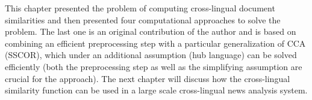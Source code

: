 \vspace{5mm}
This chapter presented the problem of computing cross-lingual document similarities and then presented four computational
approaches to solve the problem. The last one is an original contribution of the author and is based on combining an efficient
preprocessing step with a particular generalization of CCA (SSCOR), which under an additional assumption (hub language) can
be solved efficiently (both the preprocessing step as well as the simplifying assumption are crucial for the approach). The
next chapter will discuss how the cross-lingual similarity function can be used in a large scale cross-lingual news analysis system.